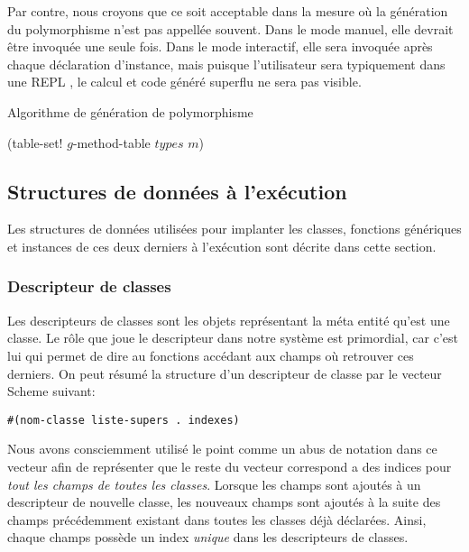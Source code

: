       Par contre, nous croyons que ce soit acceptable dans la mesure
      où la génération du polymorphisme n'est pas appellée
      souvent. Dans le mode manuel, elle devrait être invoquée une
      seule fois. Dans le mode interactif, elle sera invoquée après
      chaque déclaration d'instance, mais puisque l'utilisateur sera
      typiquement dans une \og REPL \fg, le calcul et code généré
      superflu ne sera pas visible. 

      \begin{algorithm}
        \caption{Algorithme de génération de polymorphisme}
        \label{algo-poly}
        \begin{algorithmic}
              \STATE (table-set! $g$-method-table $types$ $m$)
            \ENDFOR
          \ENDFOR
        \ENDFOR
        \end{algorithmic}
      \end{algorithm}
      

  \subsection{Structures de données à l'exécution}
    Les structures de données utilisées pour implanter les classes,
    fonctions génériques et instances de ces deux derniers à
    l'exécution sont décrite dans cette section.
  
    \subsubsection{Descripteur de classes}
      Les descripteurs de classes sont les objets représentant la méta
      entité qu'est une classe. Le rôle que joue le descripteur dans
      notre système est primordial, car c'est lui qui permet de dire
      au fonctions accédant aux champs où retrouver ces derniers. On
      peut résumé la structure d'un descripteur de classe par le
      vecteur Scheme suivant:

      \begin{lstlisting}
#(nom-classe liste-supers . indexes)
      \end{lstlisting}

      Nous avons consciemment utilisé le point comme un abus de
      notation dans ce vecteur afin de représenter que le reste du
      vecteur correspond a des indices pour \emph{tout les champs de
        toutes les classes}. Lorsque les champs sont ajoutés à un
      descripteur de nouvelle classe, les nouveaux champs sont ajoutés
      à la suite des champs précédemment existant dans toutes les
      classes déjà déclarées. Ainsi, chaque champs possède un index
      \emph{unique} dans les descripteurs de classes.

